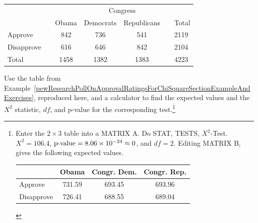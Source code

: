 
\begin{tabular}{ll ccc ll}
& & & \multicolumn{2}{c}{Congress} & \\
\cline{4-5}
 & \hspace{1mm} & Obama & Democrats & Republicans & \hspace{1mm} & Total \\
\hline
Approve				   & & 842    & 736 & 541   & 				& 2119 \\
Disapprove			   & & 616    & 646 & 842   &				& 2104 \\
\hline
Total					   & & 1458    & 1382 & 1383 & 				& 4223 \\
\hline
\end{tabular}
 

\begin{exercise}
Use the table from Example~\ref{pewResearchPollOnApprovalRatingsForChiSquareSectionExampleAndExercises}, reproduced here, and a calculator to find the expected values and the $X^2$ statistic, $df$, and p-value for the corresponding test.\footnote{Enter the $2\times 3$ table into a MATRIX A. Do STAT, TESTS, $X^2$-Test. $X^2=106.4$, $\text{\mbox{p-value}} = 8.06 \times 10^{-24}\approx 0$, and $df=2$. Editing MATRIX B, gives the following expected values.
\begin{tabular}{l ccc}
&Obama  &Congr. Dem. & Congr. Rep. \\
\hline
Approve				    & 731.59    & 693.45 & 693.96   \\
Disapprove			    & 726.41    & 688.55 & 689.04  \\
\hline
\end{tabular}
}
\end{exercise}
